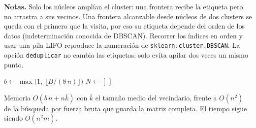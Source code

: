\documentclass[11pt]{article}
\begin{document}
\noindent\textbf{Notas.} Solo los n\'ucleos ampl\'ian el cluster: una frontera
recibe la etiqueta pero no arrastra a sus vecinos. Una frontera alcanzable
desde n\'ucleos de dos clusters se queda con el primero que la visita, por eso
su etiqueta depende del orden de los datos (indeterminaci\'on conocida de
DBSCAN). Recorrer los \'indices en orden y usar una pila LIFO reproduce la
numeraci\'on de \texttt{sklearn.cluster.DBSCAN}. La opci\'on \texttt{deduplicar}
no cambia las etiquetas: solo evita apilar dos veces un mismo punto.

\begin{algorithm}[H]
\caption{Vecindarios por bloques (\texttt{BlockedBruteForceSearch})}
$b \leftarrow \max\big(1,\ \lfloor B/(8\,n)\rfloor\big)$
$N \leftarrow [\ ]$\;
\end{algorithm}

\noindent Memoria $O(b\,n + n\bar k)$ con $\bar k$ el tama\~no medio del
vecindario, frente a $O(n^2)$ de la b\'usqueda por fuerza bruta que guarda la
matriz completa. El tiempo sigue siendo $O(n^2 m)$.

\begin{algorithm}[H]
\caption{Vecindarios por bloques optimizados (\texttt{OptimizedBlockedBruteForceSearch})}
\end{algorithm}
\end{document}
